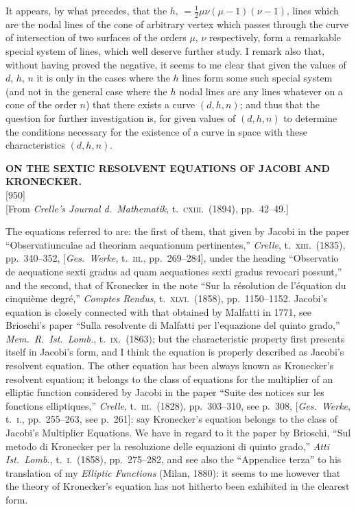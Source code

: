 \documentclass[11pt]{article}
\newcommand{\paper}[3]{%
  \clearpage
  \begin{center}
    {\large\bfseries #2}\\[0.5em]
    {\small [#1]}\\[0.3em]
    {\small #3}
  \end{center}
  \vspace{0.5em}
}
\begin{document}
\medskip\noindent
It appears, by what precedes, that the $h$, $=\tfrac{1}{2}\mu\nu(\mu-1)(\nu-1)$, lines which are the nodal lines of the cone of arbitrary vertex which passes through the curve of intersection of two surfaces of the orders $\mu$, $\nu$ respectively, form a remarkable special system of lines, which well deserve further study.  I remark also that, without having proved the negative, it seems to me clear that given the values of $d$, $h$, $n$ it is only in the cases where the $h$ lines form some such special system (and not in the general case where the $h$ nodal lines are any lines whatever on a cone of the order $n$) that there exists a curve $(d, h, n)$; and thus that the question for further investigation is, for given values of $(d, h, n)$ to determine the conditions necessary for the existence of a curve in space with these characteristics $(d, h, n)$.

\paper{950}{ON THE SEXTIC RESOLVENT EQUATIONS OF JACOBI AND KRONECKER.}{[From \textit{Crelle's Journal d.\ Mathematik}, t.\ \textsc{cxiii}.\ (1894), pp.\ 42--49.]}

\noindent The equations referred to are: the first of them, that given by Jacobi in the paper ``Observatiunculae ad theoriam aequationum pertinentes,'' \textit{Crelle}, t.\ \textsc{xiii}.\ (1835), pp.\ 340--352, [\textit{Ges.\ Werke}, t.\ \textsc{iii}., pp.\ 269--284], under the heading ``Observatio de aequatione sexti gradus ad quam aequationes sexti gradus revocari possunt,'' and the second, that of Kronecker in the note ``Sur la r\'esolution de l'\'equation du cinqui\`eme degr\'e,'' \textit{Comptes Rendus}, t.\ \textsc{xlvi}.\ (1858), pp.\ 1150--1152.  Jacobi's equation is closely connected with that obtained by Malfatti in 1771, see Brioschi's paper ``Sulla resolvente di Malfatti per l'equazione del quinto grado,'' \textit{Mem.\ R.\ Ist.\ Lomb.}, t.\ \textsc{ix}.\ (1863); but the characteristic property first presents itself in Jacobi's form, and I think the equation is properly described as Jacobi's resolvent equation.  The other equation has been always known as Kronecker's resolvent equation; it belongs to the class of equations for the multiplier of an elliptic function considered by Jacobi in the paper ``Suite des notices sur les fonctions elliptiques,'' \textit{Crelle}, t.\ \textsc{iii}.\ (1828), pp.\ 303--310, see p.\ 308, [\textit{Ges.\ Werke}, t.\ \textsc{i}., pp.\ 255--263, see p.\ 261]: say Kronecker's equation belongs to the class of Jacobi's Multiplier Equations.  We have in regard to it the paper by Brioschi, ``Sul metodo di Kronecker per la resoluzione delle equazioni di quinto grado,'' \textit{Atti Ist.\ Lomb.}, t.\ \textsc{i}.\ (1858), pp.\ 275--282, and see also the ``Appendice terza'' to his translation of my \textit{Elliptic Functions} (Milan, 1880): it seems to me however that the theory of Kronecker's equation has not hitherto been exhibited in the clearest form.
\end{document}
